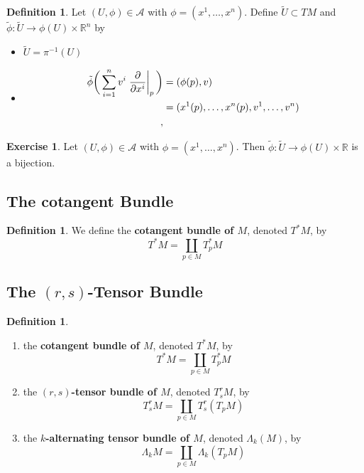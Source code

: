 \documentclass[12pt]{amsart}
\theoremstyle{definition}
\newtheorem{defn}[definition]{Definition}
\newtheorem{ex}[definition]{Exercise}
\newcommand{\Lam}{\Lambda}
\newcommand{\R}{\mathbb{R}}
\newcommand{\MA}{\mathcal{A}}
\newcommand{\tU}{\tilde{U}}
\newcommand{\tphi}{\tilde{\phi}}
\begin{document}
	\begin{defn}
		Let $(U, \phi) \in \MA$ with $\phi = (x^1, \dots, x^n)$. Define $\tilde{U} \subset TM$ and $\tilde{\phi}: \tilde{U} \rightarrow \phi(U) \times \R^{n}$ by  
		\begin{itemize}
			\item $\tU = \pi^{-1}(U)$
			\item 
			\begin{align*}
				\tphi \bigg(\sum\limits_{i =1}^n v^i \eval{\pdv{x^i}}_p \bigg) 
				&= (\phi(p), v) \\
				&= (x^1(p), \dots, x^n(p), v^1, \dots, v^n) \\
, 			\end{align*}
		\end{itemize}
	\end{defn}

	\begin{ex}
		Let $(U, \phi) \in \MA$ with $\phi = (x^1, \dots, x^n)$. Then $\tphi:\tU \rightarrow \phi(U) \times \R$ is a bijection. 
	\end{ex}














	\newpage
	\subsection{The cotangent Bundle}
	
	\begin{defn}
		We define the \textbf{cotangent bundle of $M$}, denoted $T^*M$, by 
		$$T^*M = \coprod_{p \in M} T_p^*M$$ 
	\end{defn}





	
	
	
	
	
	
	
	
	
	
	\subsection{The $(r,s)$-Tensor Bundle}
	
	\begin{defn}
	\begin{enumerate}
		\item the \textbf{cotangent bundle of $M$}, denoted $T^*M$, by 
		$$T^*M = \coprod_{p \in M} T_p^*M$$
		\item the \textbf{$(r,s)$-tensor bundle of $M$}, denoted $T^r_sM$, by
	$$T^r_s M = \coprod_{p \in M} T^r_s(T_p M)$$
	\item the \textbf{$k$-alternating tensor bundle of $M$}, denoted $\Lam_k(M)$, by
	$$\Lam_kM = \coprod_{p \in M} \Lam_k(T_pM)$$
		\end{enumerate}
	\end{defn}
	
\end{document}
